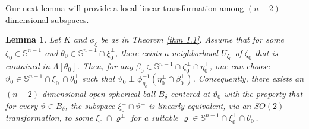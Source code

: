 \documentclass[amsfonts,reqno,11pt]{amsart}
\newtheorem{lem}{Lemma}[section]
\newcommand{\sphere}{\mathbb{S}^{n-1}}
\begin{document}
Our next lemma will provide a local linear transformation among $(n-2)$-dimensional subspaces. 
\begin{lem}\label{lem 3.2}
     Let $K$ and $\phi_\xi$ be as in Theorem \ref{thm 1.1}. Assume that for some $\zeta_0\in\sphere$ and $\theta_0\in \sphere\cap \xi_0^\perp$, there exists a neighborhood $U_{\zeta_0}$ of $\zeta_0$ that is contained in $\Lambda[\theta_0]$. Then, for any $\beta_0\in \sphere\cap \zeta_0^\perp\cap \eta_0^\perp$, one can choose $\vartheta_0\in\sphere\cap \xi_0^\perp\cap\theta_0^\perp$ such that $\vartheta_0\perp \phi^{-1}_{\eta_0}(\eta_0^\perp\cap \beta_0^\perp)$. Consequently, there exists an $(n-2)$-dimensional open spherical ball $B_\delta$ centered at $\vartheta_0$ with the property that for every $\vartheta\in B_\delta$, the subspace $\xi_0^\perp\cap\vartheta^\perp$ is linearly equivalent, via an $SO(2)$-transformation, to some $\xi_0^\perp\cap\varrho^\perp$ for a suitable $\varrho\in \sphere\cap\xi_0^\perp\cap\theta_0^\perp$.
\end{lem}
\end{document}
